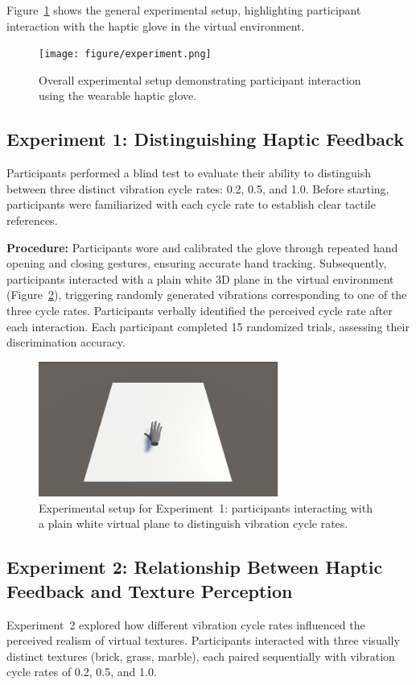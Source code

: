 \documentclass[graybox]{svmult}
\begin{document}
Figure~\ref{fig:experiment_setup} shows the general experimental setup, highlighting participant interaction with the haptic glove in the virtual environment.

\begin{figure}\centering
	\texttt{[image: figure/experiment.png]}%
	\caption{Overall experimental setup demonstrating participant interaction using the wearable haptic glove.}\label{fig:experiment_setup}
\end{figure}

\subsection{Experiment 1: Distinguishing Haptic Feedback}
Participants performed a blind test to evaluate their ability to distinguish between three distinct vibration cycle rates: 0.2, 0.5, and 1.0. Before starting, participants were familiarized with each cycle rate to establish clear tactile references.

\textbf{Procedure:} Participants wore and calibrated the glove through repeated hand opening and closing gestures, ensuring accurate hand tracking. Subsequently, participants interacted with a plain white 3D plane in the virtual environment (Figure~\ref{fig:experiment1_setup}), triggering randomly generated vibrations corresponding to one of the three cycle rates. Participants verbally identified the perceived cycle rate after each interaction. Each participant completed 15 randomized trials, assessing their discrimination accuracy.

\begin{figure}\centering
	\includegraphics[width=0.7\textwidth]{figure/ex1.png}%
	\caption{Experimental setup for Experiment~1: participants interacting with a plain white virtual plane to distinguish vibration cycle rates.}\label{fig:experiment1_setup}
\end{figure}

\subsection{Experiment 2: Relationship Between Haptic Feedback and Texture Perception}
Experiment~2 explored how different vibration cycle rates influenced the perceived realism of virtual textures. Participants interacted with three visually distinct textures (brick, grass, marble), each paired sequentially with vibration cycle rates of 0.2, 0.5, and 1.0.
\end{document}

